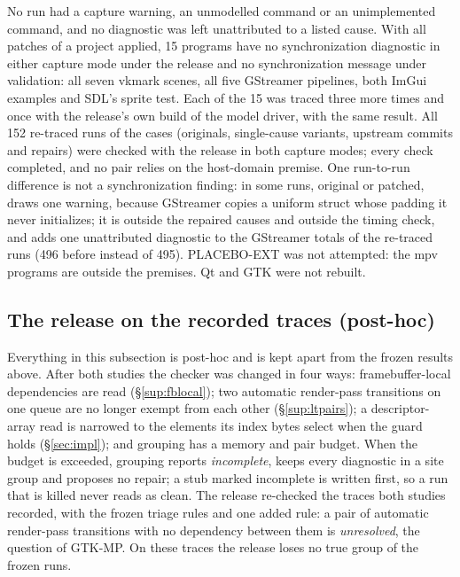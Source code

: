 No run had a capture warning, an unmodelled command or an unimplemented command, and no diagnostic was left
unattributed to a listed cause. With all patches of a project applied, 15 programs have no synchronization diagnostic in
either capture mode under the release and no synchronization message under validation: all seven vkmark scenes, all five GStreamer
pipelines, both ImGui examples and SDL's sprite test. Each of the 15 was traced three more times and once with the
release's own build of the model driver, with the same result. All 152 re-traced runs of the cases (originals,
single-cause variants, upstream commits and repairs) were checked with the release in both capture modes; every check
completed, and no pair relies on the host-domain premise. One run-to-run difference is not a synchronization finding: in
some runs, original or patched,  draws one  warning, because
GStreamer copies a uniform struct whose padding it never initializes; it is outside the repaired causes and outside
the timing check, and adds one unattributed diagnostic to the GStreamer totals of the re-traced runs (496 before
instead of 495). PLACEBO-EXT was not attempted: the mpv programs are outside the premises. Qt and GTK were not
rebuilt.

\subsection{The release on the recorded traces (post-hoc)}
\label{sup:release-posthoc}
Everything in this subsection is post-hoc and is kept apart from the frozen results above. After both studies the
checker was changed in four ways: framebuffer-local dependencies are read (\S\ref{sup:fblocal}); two automatic
render-pass transitions on one queue are no longer exempt from each other (\S\ref{sup:ltpairs}); a descriptor-array
read is narrowed to the elements its index bytes select when the guard holds (\S\ref{sec:impl}); and grouping has a
memory and pair budget. When the budget is exceeded, grouping reports \emph{incomplete}, keeps every diagnostic in a
site group and proposes no repair; a stub marked incomplete is written first, so a run that is killed never reads as
clean. The release re-checked the traces both studies recorded, with the frozen triage rules and one added rule: a
pair of automatic render-pass transitions with no dependency between them is \emph{unresolved}, the question of
GTK-MP. On these traces the release loses no true group of the frozen runs.


